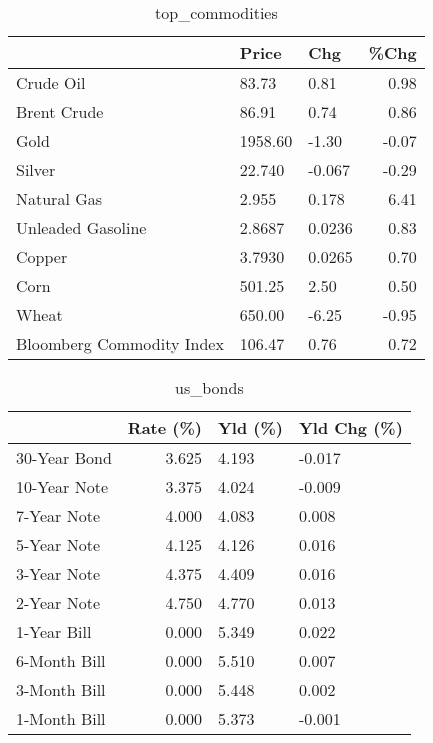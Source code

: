 \documentclass{article}%
\begin{document}
\begin{table}[htbp]%
\caption{top\_commodities}%
\centering%
\begin{adjustbox}{width=1\textwidth}%
\begin{tabular}{lllr}
\toprule
                          &   Price &    Chg &  \%Chg \\
\midrule
               Crude Oil  &   83.73 &   0.81 &  0.98 \\
             Brent Crude  &   86.91 &   0.74 &  0.86 \\
                    Gold  & 1958.60 &  -1.30 & -0.07 \\
                  Silver  &  22.740 & -0.067 & -0.29 \\
             Natural Gas  &   2.955 &  0.178 &  6.41 \\
       Unleaded Gasoline  &  2.8687 & 0.0236 &  0.83 \\
                  Copper  &  3.7930 & 0.0265 &  0.70 \\
                    Corn  &  501.25 &   2.50 &  0.50 \\
                   Wheat  &  650.00 &  -6.25 & -0.95 \\
Bloomberg Commodity Index &  106.47 &   0.76 &  0.72 \\
\bottomrule
\end{tabular}
%
\end{adjustbox}%
\end{table}

%


\begin{table}[htbp]%
\caption{us\_bonds}%
\centering%
\begin{adjustbox}{width=1\textwidth}%
\begin{tabular}{lrll}
\toprule
             &  Rate (\%) & Yld (\%) & Yld Chg (\%) \\
\midrule
30-Year Bond &     3.625 &   4.193 &      -0.017 \\
10-Year Note &     3.375 &   4.024 &      -0.009 \\
 7-Year Note &     4.000 &   4.083 &       0.008 \\
 5-Year Note &     4.125 &   4.126 &       0.016 \\
 3-Year Note &     4.375 &   4.409 &       0.016 \\
 2-Year Note &     4.750 &   4.770 &       0.013 \\
 1-Year Bill &     0.000 &   5.349 &       0.022 \\
6-Month Bill &     0.000 &   5.510 &       0.007 \\
3-Month Bill &     0.000 &   5.448 &       0.002 \\
1-Month Bill &     0.000 &   5.373 &      -0.001 \\
\bottomrule
\end{tabular}
%
\end{adjustbox}%
\end{table}
\end{document}
